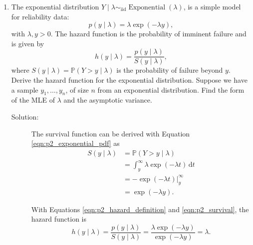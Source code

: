 \documentclass[letterpaper,11pt]{article}
\begin{document}
\begin{enumerate}
  \begin{enumerate}
  \item The exponential distribution
    $Y \mid \lambda \sim_\mathrm{iid} \operatorname{Exponential}(\lambda)$, is a
    simple model for reliability data:
    \begin{equation}
      p\left(y \mid \lambda \right) =
      \lambda \exp\left(-\lambda y\right),
      \label{eqn:p2_exponential_pdf}
    \end{equation}
    with $\lambda, y > 0$. The hazard function is the probability of imminent
    failure and is given by
    \begin{equation}
      h\left(y\mid\lambda\right) =
      \frac{p\left(y \mid \lambda\right)}{S\left(y\mid\lambda\right)},
      \label{eqn:p2_hazard_definition}
    \end{equation}
    where
    $S\left(y\mid\lambda\right) = \mathbb{P}\left(Y > y \mid \lambda\right)$ is
    the probability of failure beyond $y$. Derive the hazard function for the
    exponential distribution. Suppose we have a sample $y_1,\ldots,y_n$, of size
    $n$ from an exponential distribution. Find the form of the MLE of $\lambda$
    and the asymptotic variance.
      \begin{description}
      \item[Solution:] The survival function can be derived with Equation
        \ref{eqn:p2_exponential_pdf} as
        \begin{align}
          S\left(y\mid\lambda\right)
          &= \mathbb{P}\left(Y > y \mid \lambda\right) \nonumber\\
          &= \int_y^\infty \lambda \exp\left(-\lambda t\right)\,\mathrm{d}t \nonumber\\
          &= \left. -\exp\left(-\lambda t\right) \right|^\infty_y \nonumber \\
          &= \exp\left(-\lambda y\right).
            \label{eqn:p2_survival}
        \end{align}

        With Equations \ref{eqn:p2_hazard_definition} and \ref{eqn:p2_survival},
        the hazard function is
        \begin{equation}
          h\left(y\mid\lambda\right) =
          \frac{p\left(y \mid \lambda\right)}{S\left(y\mid\lambda\right)}
          = \frac{\lambda \exp\left(-\lambda y\right)}{\exp\left(-\lambda y\right)} = \lambda.
          \label{eqn:p2_hazard}
        \end{equation}
      \end{description}


\end{enumerate}
\end{enumerate}
\end{document}
